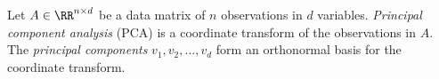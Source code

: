 Let \(A \in \RR^{n \times d}\) be a data matrix of \(n\) observations in \(d\) variables.
\textit{Principal component analysis} (PCA) is a coordinate transform of the observations in \(A\).
The \textit{principal components} \(v_1, v_2, \dots, v_d\) form an orthonormal basis for the coordinate transform.